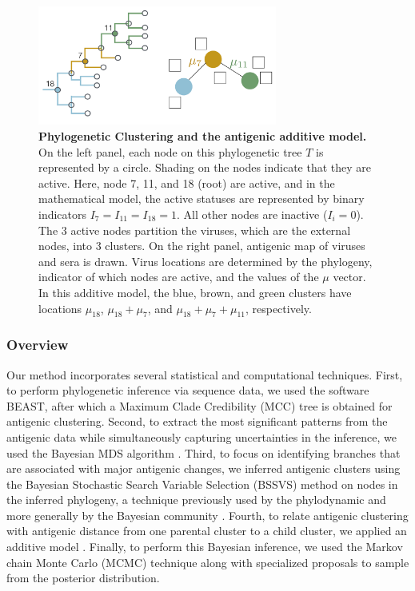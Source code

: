 \documentclass[11pt,oneside,letterpaper]{article}
\begin{document}
\begin{figure}[h]
	\centering		
	\includegraphics[width=0.7\textwidth]{figures/lineArt/schematicDiagram}
	\caption{\textbf{Phylogenetic Clustering and the antigenic additive model.} 
On the left panel, each node on this phylogenetic tree $T$ is represented by a circle. 
Shading on the nodes indicate that they are active.
Here, node 7, 11, and 18 (root) are active, and in the mathematical model, the active statuses are represented by binary indicators $I_{7}=I_{11}=I_{18} = 1$. 
All other nodes are inactive ($I_i=0$). 
The 3 active nodes partition the viruses, which are the external nodes, into 3 clusters.
On the right panel, antigenic map of viruses and sera is drawn.
Virus locations are determined by the phylogeny, indicator of which nodes are active, and the values of the $\mu$ vector.
In this additive model, the blue, brown, and green clusters have locations $\mu_{18}$, $\mu_{18} + \mu_7$, and $\mu_{18}+ \mu_7 + \mu_{11}$, respectively.
	} 
	\label{additiveModel} 
\end{figure}


\subsubsection*{Overview}
Our method incorporates several statistical and computational techniques. 
First, to perform phylogenetic inference via sequence data, we used the software BEAST, after which a Maximum Clade Credibility (MCC) tree is obtained for antigenic clustering.
Second, to extract the most significant patterns from the antigenic data while simultaneously capturing uncertainties in the inference, we used the Bayesian MDS algorithm \cite{oh_bayesian_2001}.
Third, to focus on identifying branches that are associated with major antigenic changes, we inferred antigenic clusters using the Bayesian Stochastic Search Variable Selection (BSSVS) method on nodes in the inferred phylogeny, a technique previously used by the phylodynamic \cite{lemey_bayesian_2009, drummond_bayesian_2010} and more generally by the Bayesian community \cite{kuo_variable_1998, hugh_chipman_practical_2001}.
Fourth, to relate antigenic clustering with antigenic distance from one parental cluster to a child cluster, we applied an additive model \cite{drummond_bayesian_2010}.
Finally, to perform this Bayesian inference, we used the Markov chain Monte Carlo (MCMC) technique along with specialized proposals to sample from the posterior distribution. 
\end{document}
